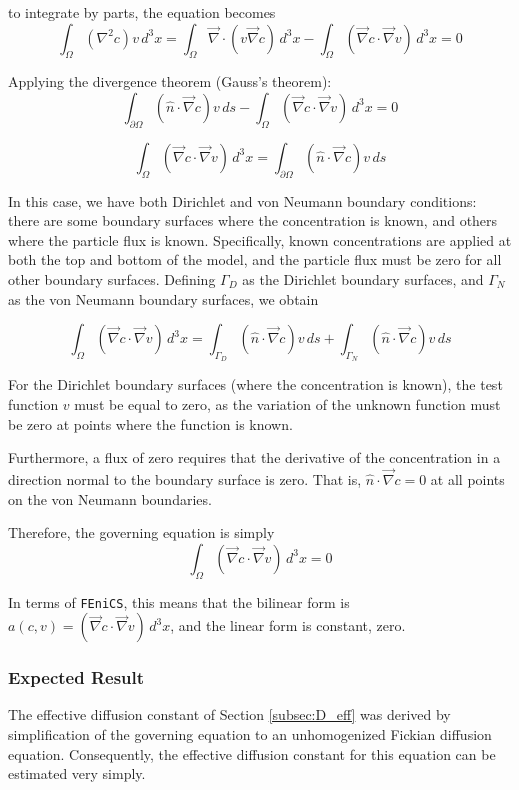 \documentclass{article}
\begin{document}
to integrate by parts, the equation becomes
$$ \int_{\Omega} \left(\nabla^2 c \right) v \,d^3x =
\int_{\Omega} \vec{\nabla} \cdot \left( v \vec{\nabla} c \right) \,d^3x
- \int_{\Omega} \left( \vec{\nabla}c \cdot \vec{\nabla}v \right) \,d^3x =0$$

Applying the divergence theorem (Gauss's theorem):
$$\int_{\partial\Omega} \left( \hat{n} \cdot \vec{\nabla} c \right) v\,ds
- \int_{\Omega} \left( \vec{\nabla}c \cdot \vec{\nabla}v \right) \,d^3x = 0$$

$$\int_{\Omega} \left( \vec{\nabla}c \cdot \vec{\nabla}v \right) \,d^3x =
\int_{\partial\Omega} \left( \hat{n} \cdot \vec{\nabla} c \right) v\,ds$$

In this case, we have both Dirichlet and von Neumann boundary conditions:
there are some boundary surfaces where the concentration is known,
and others where the particle flux is known.
Specifically, known concentrations are applied at both the top and bottom of the model,
and the particle flux must be zero for all other boundary surfaces.
Defining $\Gamma_D$ as the Dirichlet boundary surfaces,
and $\Gamma_N$ as the von Neumann boundary surfaces, we obtain

$$\int_{\Omega} \left( \vec{\nabla}c \cdot \vec{\nabla}v \right) \,d^3x =
\int_{\Gamma_D} \left( \hat{n} \cdot \vec{\nabla} c \right) v\,ds
+\int_{\Gamma_N} \left( \hat{n} \cdot \vec{\nabla} c \right) v\,ds$$

For the Dirichlet boundary surfaces (where the concentration is known),
the test function $v$ must be equal to zero,
as the variation of the unknown function must be zero at points where the function is known.

Furthermore, a flux of zero requires that the derivative of the concentration in a direction
normal to the boundary surface is zero.
That is, $\hat{n} \cdot \vec{\nabla} c = 0$ at all points on the von Neumann boundaries.

Therefore, the governing equation is simply
$$\int_{\Omega} \left( \vec{\nabla}c \cdot \vec{\nabla}v \right) \,d^3x = 0$$

In terms of \texttt{FEniCS}, this means that the bilinear form is
$a(c,v)=\left( \vec{\nabla}c \cdot \vec{\nabla}v \right) \,d^3x$,
and the linear form is constant, zero.

\subsubsection{Expected Result}

The effective diffusion constant of Section \ref{subsec:D_eff}
was derived by simplification of the governing equation
to an unhomogenized Fickian diffusion equation.
Consequently, the effective diffusion constant for this equation
can be estimated very simply.
\end{document}
